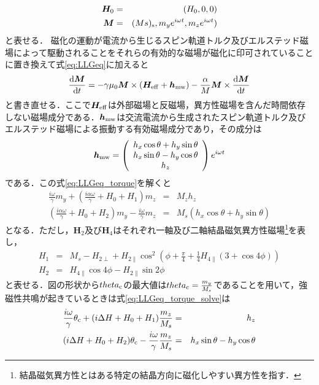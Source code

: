 \begin{eqnarray}
\bm{H}_{0} &=& (H_{0},0,0)\\
\bm{M} &=& (Ms)_{\rm s},m_{y}e^{i\omega t},m_{z}e^{i\omega t})
\label{eq:H,M}
\end{eqnarray}
と表せる．
磁化の運動が電流から生じるスピン軌道トルク及びエルステッド磁場によって駆動されることをそれらの有効的な磁場が磁化に印可されていることに置き換えて式\ref{eq:LLGeq}に加えると
\begin{eqnarray}
\frac{\mathrm{d}\bm{M}}{\mathrm{d}t}=-\gamma\mu_{0}\bm{M}\times(\bm{H}_{\rm eff} + \bm{h}_{\rm mw})-\frac{\alpha}{M}\bm{M}\times\frac{\mathrm{d}\bm{M}}{\mathrm{d}t}
\label{eq:LLGeq_torque}
\end{eqnarray}
と書き直せる．ここで$\bm{H}_{\rm eff}$は外部磁場と反磁場，異方性磁場を含んだ時間依存しない磁場成分である．$\bm{h}_{\rm mw}$は交流電流から生成されたスピン軌道トルク及びエルステッド磁場による振動する有効磁場成分であり，その成分は
\begin{eqnarray}
\bm{h}_{\rm mw} = \left(
\begin{array}{c}
h_{x}\cos\theta + h_{y}\sin\theta\\
h_{x}\sin\theta - h_{y}\cos\theta\\
h_{z}
\end{array}
\right)e^{i\omega t}
\label{eq:hmw}
\end{eqnarray}
である．この式\ref{eq:LLGeq_torque}を解くと
\begin{eqnarray}
\frac{i\omega}{\gamma}m_{y} + \left(\frac{i\alpha\omega}{\gamma} + H_{0} + H_{1} \right)m_{z} &=& M_{z}h_{z}\\
\left(\frac{i\alpha\omega}{\gamma} + H_{0} + H_{2}\right)m_{y} - \frac{i\omega}{\gamma}m_{z} &=& M_{s}(h_{x}\cos\theta + h_{y}\sin\theta)
\label{eq:LLGeq_torque_solve}
\end{eqnarray}
となる．ただし，$\bm{H}_{2}$及び$\bm{H}_{4}$はそれぞれ一軸及び二軸結晶磁気異方性磁場\footnote{結晶磁気異方性とはある特定の結晶方向に磁化しやすい異方性を指す．}を表し，
\begin{eqnarray}
H_{1} &=& M_{s} - H_{2\perp} + H_{2\parallel}\cos^{2}(\phi + \frac{\pi}{4} + \frac{1}{4}H_{4\parallel}(3+\cos4\phi))\\\nonumber
H_{2} &=& H_{4\parallel}\cos4\phi - H_{2\parallel}\sin2\phi
\nonumber
\end{eqnarray}
と表せる．図の形状から$theta_{\rm c}$の最大値は$theta_{\rm c} = \frac{m_{y}}{M_{s}}$であることを用いて，強磁性共鳴が起きているときは式\ref{eq:LLGeq_torque_solve}は
\begin{eqnarray}
\frac{i\omega}{\gamma}\theta_{\rm c} +(i\Delta H + H_{0} + H_{1})\frac{m_{z}}{M_{s}} &=& h_{z}\\
(i\Delta H + H_{0} + H_{2})\theta_{\rm c} - \frac{i\omega}{\gamma}\frac{m_{z}}{M_{s}} &=& h_{x}\sin\theta - h_{y}\cos\theta
\label{eq:LLGeq_torque_thetac}
\end{eqnarray}
